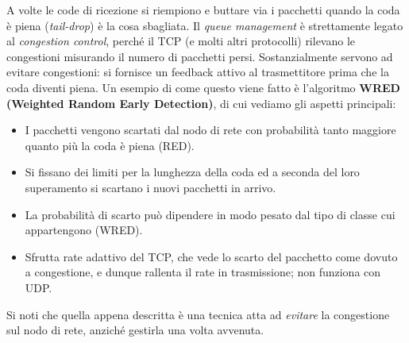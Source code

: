 A volte le code di ricezione si riempiono e buttare via i pacchetti quando la coda è piena (\textit{tail-drop}) è la cosa sbagliata. Il \textit{queue management} è strettamente legato al \textit{congestion control}, perché il TCP (e molti altri protocolli) rilevano le congestioni misurando il numero di pacchetti persi. Sostanzialmente servono ad evitare congestioni: si fornisce un feedback attivo al trasmettitore prima che la coda diventi piena. Un esempio di come questo viene fatto è l'algoritmo \textbf{WRED (Weighted Random Early Detection)}, di cui vediamo gli aspetti principali:
\begin{itemize}
	\item I pacchetti vengono scartati dal nodo di rete con probabilità tanto maggiore quanto più la coda è piena (RED).
	\item Si fissano dei limiti per la lunghezza della coda ed a seconda del loro superamento si scartano i nuovi pacchetti in arrivo.
	\item La probabilità di scarto può dipendere in modo pesato dal tipo di classe cui appartengono (WRED).
	\item Sfrutta rate adattivo del TCP, che vede lo scarto del pacchetto come dovuto a congestione, e dunque rallenta il rate in trasmissione; non funziona con UDP.
\end{itemize}
Si noti che quella appena descritta è una tecnica atta ad \textit{evitare} la congestione sul nodo di rete, anziché gestirla una volta avvenuta.

